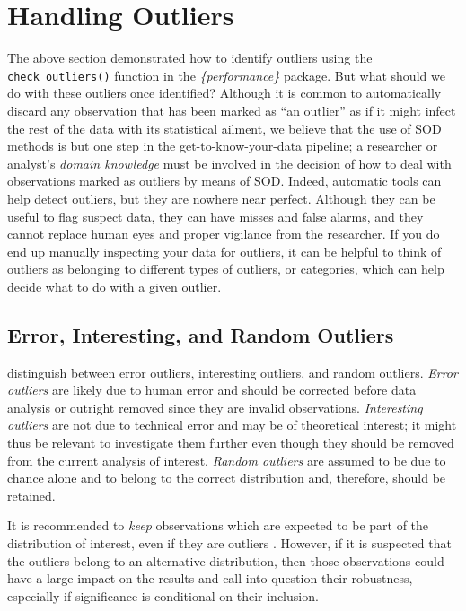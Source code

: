 \documentclass[mathematics,article,submit,moreauthors,pdftex]{mdpi}
\begin{document}
\hypertarget{handling-outliers}{%
\section{Handling Outliers}\label{handling-outliers}}

The above section demonstrated how to identify outliers using the
\texttt{check\_outliers()} function in the \emph{\{performance\}}
package. But what should we do with these outliers once identified?
Although it is common to automatically discard any observation that has
been marked as ``an outlier'' as if it might infect the rest of the data
with its statistical ailment, we believe that the use of SOD methods is
but one step in the get-to-know-your-data pipeline; a researcher or
analyst's \emph{domain knowledge} must be involved in the decision of
how to deal with observations marked as outliers by means of SOD.
Indeed, automatic tools can help detect outliers, but they are nowhere
near perfect. Although they can be useful to flag suspect data, they can
have misses and false alarms, and they cannot replace human eyes and
proper vigilance from the researcher. If you do end up manually
inspecting your data for outliers, it can be helpful to think of
outliers as belonging to different types of outliers, or categories,
which can help decide what to do with a given outlier.

\hypertarget{error-interesting-and-random-outliers}{%
\subsection{Error, Interesting, and Random
Outliers}\label{error-interesting-and-random-outliers}}

\citet{leys2019outliers} distinguish between error outliers, interesting
outliers, and random outliers. \emph{Error outliers} are likely due to
human error and should be corrected before data analysis or outright
removed since they are invalid observations. \emph{Interesting outliers}
are not due to technical error and may be of theoretical interest; it
might thus be relevant to investigate them further even though they
should be removed from the current analysis of interest. \emph{Random
outliers} are assumed to be due to chance alone and to belong to the
correct distribution and, therefore, should be retained.

It is recommended to \emph{keep} observations which are expected to be
part of the distribution of interest, even if they are outliers
\citep{leys2019outliers}. However, if it is suspected that the outliers
belong to an alternative distribution, then those observations could
have a large impact on the results and call into question their
robustness, especially if significance is conditional on their
inclusion.
\end{document}
